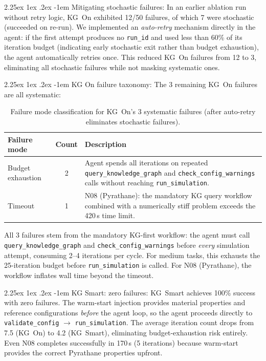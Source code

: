 \documentclass[preprint,review,12pt]{elsarticle}
\makeatletter
\renewcommand\paragraph{\@startsection{paragraph}{4}{\z@}%
  {2.25ex \@plus1ex \@minus.2ex}%
  {-1em}%
  {\normalfont\normalsize\bfseries}}
\makeatother
\begin{document}
\paragraph{Mitigating stochastic failures:}
In an earlier ablation run without retry logic, KG~On exhibited 12/50
failures, of which 7 were stochastic (succeeded on re-run).  We
implemented an \emph{auto-retry} mechanism directly in the agent:
if the first attempt produces no \texttt{run\_id} and used less than
60\% of its iteration budget (indicating early stochastic exit rather
than budget exhaustion), the agent automatically retries once.
This reduced KG~On failures from 12 to 3, eliminating all stochastic
failures while not masking systematic ones.

\paragraph{KG On failure taxonomy:}
The 3 remaining KG~On failures are all systematic:

\begin{table}[htbp]
\centering\footnotesize
\caption{Failure mode classification for KG~On's 3 systematic failures
  (after auto-retry eliminates stochastic failures).}
\label{tab:failure-modes}
\setlength{\tabcolsep}{4pt}
\begin{tabular}{lcp{5.2cm}}
\toprule
Failure mode & Count & Description \\
\midrule
Budget exhaustion  & 2 &
  Agent spends all iterations on repeated
  \texttt{query\_knowledge\_graph} and
  \texttt{check\_config\_warnings} calls without
  reaching \texttt{run\_simulation}. \\
\addlinespace
Timeout & 1 &
  N08 (Pyrathane): the mandatory KG query workflow
  combined with a numerically stiff problem exceeds the
  420\,s time limit. \\
\bottomrule
\end{tabular}
\end{table}

All 3 failures stem from the mandatory KG-first workflow: the agent
must call \texttt{query\_knowledge\_graph} and
\texttt{check\_config\_warnings} before \emph{every} simulation attempt,
consuming 2--4 iterations per cycle.  For medium tasks, this exhausts
the 25-iteration budget before \texttt{run\_simulation} is called.
For N08 (Pyrathane), the workflow inflates wall time beyond the timeout.

\paragraph{KG Smart: zero failures:}
KG~Smart achieves 100\% success with zero failures.  The warm-start
injection provides material properties and reference configurations
\emph{before} the agent loop, so the agent proceeds directly to
\texttt{validate\_config} $\to$ \texttt{run\_simulation}.  The average
iteration count drops from 7.5 (KG~On) to 4.2 (KG~Smart), eliminating
budget-exhaustion risk entirely.  Even N08 completes successfully in
170\,s (5 iterations) because warm-start provides the correct Pyrathane
properties upfront.
\end{document}
